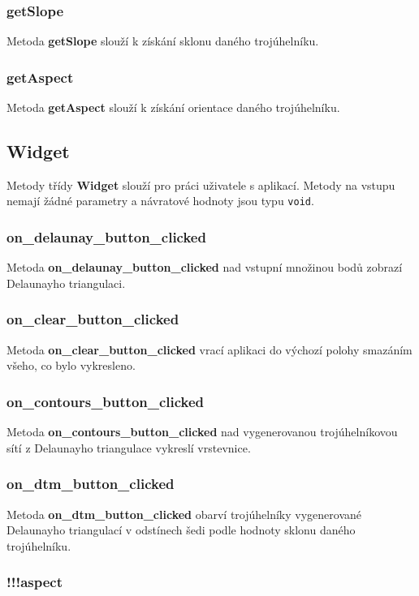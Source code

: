\documentclass[a4paper, 12pt]{article}
\begin{document}
\subsubsection*{getSlope}
Metoda \textbf{getSlope} slouží k získání sklonu daného trojúhelníku. 

\subsubsection*{getAspect}
Metoda \textbf{getAspect} slouží k získání orientace daného trojúhelníku. 


\subsection{Widget}
Metody třídy \textbf{Widget} slouží pro práci uživatele s aplikací. Metody na vstupu nemají žádné parametry a návratové hodnoty jsou typu \texttt{void}.

\subsubsection*{on\_delaunay\_button\_clicked}
Metoda \textbf{on\_delaunay\_button\_clicked} nad vstupní množinou bodů zobrazí Delaunayho triangulaci. 

\subsubsection*{on\_clear\_button\_clicked}
Metoda \textbf{on\_clear\_button\_clicked} vrací aplikaci do výchozí polohy smazáním všeho, co bylo vykresleno. 

\subsubsection*{on\_contours\_button\_clicked}
Metoda \textbf{on\_contours\_button\_clicked} nad vygenerovanou trojúhelníkovou sítí z Delaunayho triangulace vykreslí vrstevnice. 

\subsubsection*{on\_dtm\_button\_clicked}
Metoda \textbf{on\_dtm\_button\_clicked} obarví trojúhelníky vygenerované Delaunayho triangulací v odstínech šedi podle hodnoty sklonu daného trojúhelníku.

\subsubsection*{!!!aspect}
\end{document}
